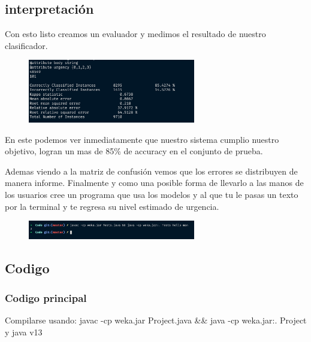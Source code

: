 \documentclass[12pt, fleqn]{report}                             %
\theoremstyle{break}                                            %
\begin{document}
        \subsection{interpretación}

        Con esto listo creamos un evaluador y medimos el resultado de nuestro clasificador.
        \begin{figure}[h!]
            \centering
            \includegraphics[width=0.65\textwidth]{result}
        \end{figure}

        En este podemos ver inmediatamente que nuestro sistema cumplio nuestro objetivo, 
        logran un mas de 85\% de accuracy en el conjunto de prueba.

        Ademas viendo a la matriz de confusión vemos que los errores se distribuyen de manera informe.
        Finalmente y como una posible forma de llevarlo a las manos de los usuarios cree un programa que usa
        los modelos y al que tu le pasas un texto por la terminal y te regresa su nivel estimado de urgencia.

        \begin{figure}[h!]
            \centering
            \includegraphics[width=0.65\textwidth]{man}
        \end{figure}

        \subsection{Codigo}
        \subsubsection{Codigo principal}
        Compilarse usando: javac -cp weka.jar Project.java \&\& java -cp weka.jar:. Project   
        y java v13
\end{document}
